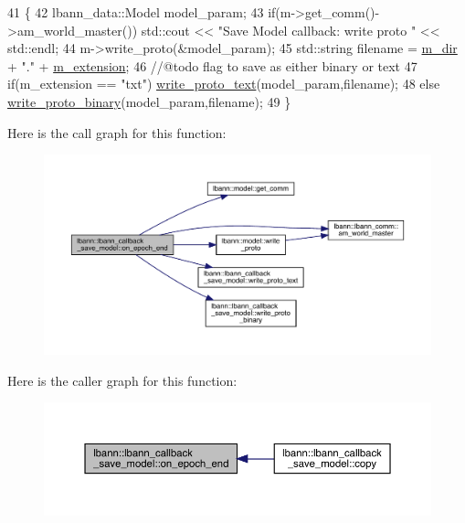 \begin{DoxyCode}
41                                                      \{
42   lbann\_data::Model model\_param;
43   \textcolor{keywordflow}{if}(m->get\_comm()->am\_world\_master()) std::cout << \textcolor{stringliteral}{"Save Model callback: write proto "} << std::endl; 
44   m->write\_proto(&model\_param);
45   std::string filename = \hyperlink{classlbann_1_1lbann__callback__save__model_aca89bd794b4a15b3beb89f3da464fbcd}{m\_dir} + \textcolor{stringliteral}{"."} + \hyperlink{classlbann_1_1lbann__callback__save__model_a76f51ce7ea7bbb1aff331102c87662bd}{m\_extension};
46   \textcolor{comment}{//@todo flag to save as either binary or text}
47   \textcolor{keywordflow}{if}(m\_extension == \textcolor{stringliteral}{"txt"}) \hyperlink{classlbann_1_1lbann__callback__save__model_a9dd2617a12810287c4f5cb87746e71ea}{write\_proto\_text}(model\_param,filename);
48   \textcolor{keywordflow}{else} \hyperlink{classlbann_1_1lbann__callback__save__model_a3c06fcc91890d4fe51a07672152b91a5}{write\_proto\_binary}(model\_param,filename);
49 \}
\end{DoxyCode}
Here is the call graph for this function\+:\nopagebreak
\begin{figure}[H]
\begin{center}
\leavevmode
\includegraphics[width=350pt]{classlbann_1_1lbann__callback__save__model_ae047ee35b65e9bda4080a83833612699_cgraph}
\end{center}
\end{figure}
Here is the caller graph for this function\+:\nopagebreak
\begin{figure}[H]
\begin{center}
\leavevmode
\includegraphics[width=350pt]{classlbann_1_1lbann__callback__save__model_ae047ee35b65e9bda4080a83833612699_icgraph}
\end{center}
\end{figure}
\mbox{\label{classlbann_1_1lbann__callback__save__model_a606ca0b8144e6cedc96311d9e74c04b7}} 
